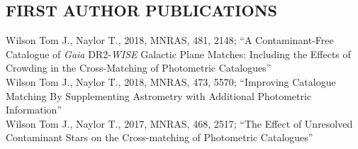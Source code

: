 \documentclass[letter, margin, 10pt]{res} %
\begin{document}
\begin{resume}
\section{FIRST AUTHOR PUBLICATIONS}

Wilson Tom J., Naylor T., 2018, MNRAS, 481, 2148; ``A Contaminant-Free Catalogue of \textit{Gaia} DR2-\textit{WISE} Galactic Plane Matches: Including the Effects of Crowding in the Cross-Matching of Photometric Catalogues''\vspace{2pt}\\
Wilson Tom J., Naylor T., 2018, MNRAS, 473, 5570; ``Improving Catalogue Matching By Supplementing Astrometry with Additional Photometric Information''\vspace{2pt}\\
Wilson Tom J., Naylor T., 2017, MNRAS, 468, 2517; ``The Effect of Unresolved Contaminant Stars on the Cross-matching of Photometric Catalogues''
\vspace{-5pt}

\end{resume}
\end{document}

